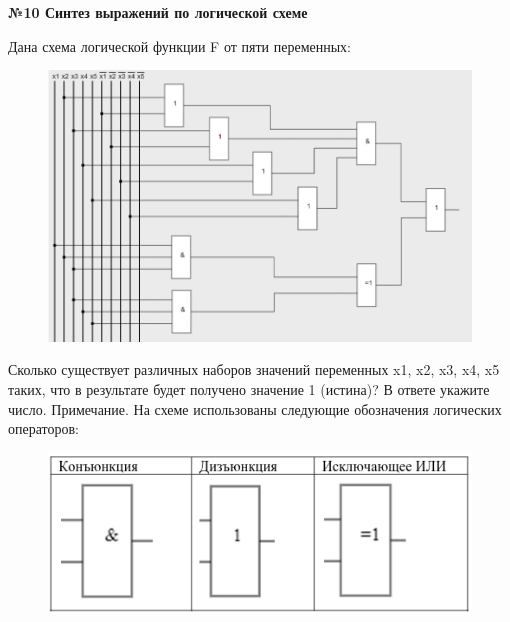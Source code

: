    \newpage
    \begin{center}
        \textbf{№10 Синтез выражений по логической схеме}
    \end{center}

    Дана схема логической функции F от пяти переменных:
    \begin{figure}[h]
        \centering
        \includegraphics[width=1.0  \linewidth]{images/img}
    \end{figure}

    Сколько существует различных наборов значений переменных x1, x2, x3, x4, x5 таких, что в результате будет получено
    значение 1 (истина)? В ответе укажите число.
    Примечание. На схеме использованы следующие обозначения логических операторов:
    \begin{figure}[h]
        \centering
        \includegraphics[width=0.6  \linewidth]{images/img_1}
    \end{figure}



